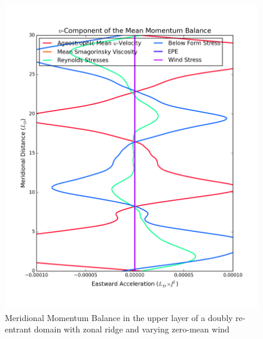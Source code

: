 \documentclass[12pt,a4paper]{report}
\begin{document}
 
 \begin{figure}
 	\centering
 	\begin{minipage}[b]{0.45\linewidth}
 		\centering
 		\includegraphics[width=\linewidth ]{vmom_3}
 		\caption{Meridional Momentum Balance in the upper layer of 
 			a doubly re-entrant domain with 
 			zonal ridge and varying zero-mean wind}
 		\label{fig:vmomlayer3}
 	\end{minipage}
 	\quad
 	\begin{minipage}[b]{0.45\linewidth}
 		\centering

\end{minipage}
\end{figure}
\end{document}
